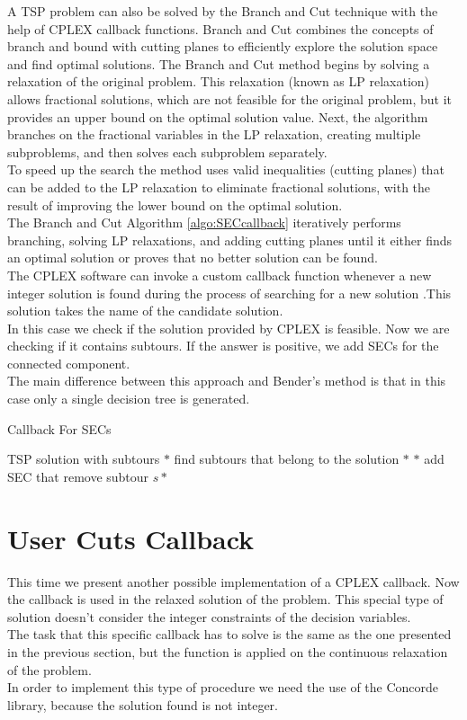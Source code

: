 A TSP problem can also be solved by the Branch and Cut technique with the help of CPLEX callback functions. Branch and Cut combines the concepts of branch and bound with cutting planes to efficiently explore the solution space and find optimal solutions. The Branch and Cut method begins by solving a relaxation of the original problem. This relaxation (known as LP relaxation) allows fractional solutions, which are not feasible for the original problem, but it provides an upper bound on the optimal solution value.
Next, the algorithm branches on the fractional variables in the LP relaxation, creating multiple subproblems, and then solves each subproblem separately.\\
To speed up the search the method uses valid inequalities (cutting planes) that can be added to the LP relaxation to eliminate fractional solutions, with the result of improving the lower bound on the optimal solution. \\
The Branch and Cut Algorithm \ref{algo:SECcallback} iteratively performs branching, solving LP relaxations, and adding cutting planes until it either finds an optimal solution or proves that no better solution can be found. \\
The CPLEX software can invoke a custom callback function whenever a new integer solution is found during the process of searching for a new solution .This solution takes the name of the candidate solution.\\
In this case we check if the solution provided by CPLEX is feasible. Now we are checking if it contains subtours. If the answer is positive, we add SECs for the connected component. \\
The main difference between this approach and Bender’s method is that in this case only a single decision tree is generated.

\begin{algorithm}
    \caption{Callback For SECs}\label{algo:SECcallback}
    \begin{algorithmic}[1]
    \Require TSP solution with subtours
    \State $*$ find subtours that belong to the solution $*$
    \State $*$ add SEC that remove subtour $s *$
    \EndFor
    
    \end{algorithmic}
\end{algorithm}


\section{User Cuts Callback}
This time we present another possible implementation of a CPLEX callback. Now the callback is used in the relaxed solution of the problem. This special type of solution doesn’t consider the integer constraints of the decision variables. \\
The task that this specific callback has to solve is the same as the one presented in the previous section, but the function  is applied on the continuous relaxation of the problem.\\
In order to implement this type of procedure we need the use of the Concorde library, because the solution found is not integer.

